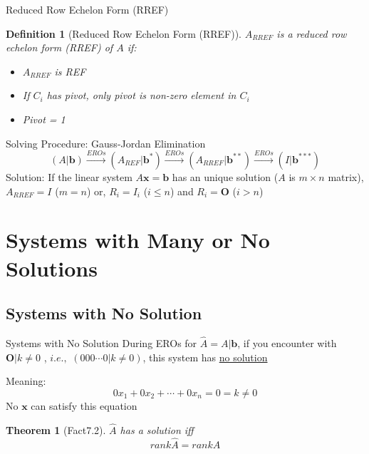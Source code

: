 \documentclass[a4paper,11pt]{article}
\newtheorem{defn}{Definition}
\newtheorem{thm}{Theorem}
\begin{document}
\begin{frame}[t]{Reduced Row Echelon Form (RREF)}
	\begin{defn}
		[Reduced Row Echelon Form (RREF)]
		$A_{RREF}$ is a reduced row echelon form (RREF) of $A$ if:
		\begin{itemize}
			\item $A_{RREF}$ is REF
			\item If $C_i$ has pivot, only pivot is non-zero element in $C_i$
			\item Pivot = 1
		\end{itemize}
	\end{defn}
	\begin{block}
		{Solving Procedure: Gauss-Jordan Elimination}
		\[
			(A\vert \mathbf{b}) \xrightarrow{EROs} (A_{REF}\vert \mathbf{b}^\ast) \xrightarrow{EROs} (A_{RREF}\vert \mathbf{b}^{\ast\ast}) \xrightarrow{EROs} (I|\mathbf{b}^{\ast\ast\ast})
		\]
		Solution: If the linear system $A\mathbf{x}=\mathbf{b}$ has an unique solution ($A$ is $m\times n$ matrix), $A_{RREF}=I$ ($m=n$) or, $R_i = I_i$ ($i\le n$) and $R_i = \mathbf{O} $ ($i>n$)
	\end{block}
\end{frame}
\section{Systems with Many or No Solutions} %
\label{sec:systems_with_many_or_no_solutions}
\subsection{Systems with No Solution} %
\label{sub:systems_with_no_solution}
\begin{frame}[t]{Systems with No Solution}
	During EROs for $\hat A = A\vert \mathbf{b}$, if you encounter with $ \mathbf{O}\vert k\neq 0$ , $i.e.,$ $(0 0 0\cdots 0\vert k\neq 0)$, this system has \uline{no solution} 
	
	Meaning: \[
		0 x_1 + 0 x_2 + \cdots + 0 x_n = 0 = k \neq 0 \tag{contradiction!}
	\]
	No $\mathbf{x}$ can satisfy this equation
	\begin{thm}
		[Fact7.2]
		$\hat A$ has a solution iff \[
			rank \hat A = rank A
		\]
	\end{thm}
\end{frame}
\end{document}
